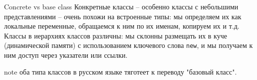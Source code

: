 \documentclass[
    8pt,
    hyperref={pdfencoding=unicode}
    ]{beamer}
\theoremstyle{definition}
\begin{document}
\begin{frame}[fragile]{Concrete vs base class}
    Конкретные классы -- особенно классы с небольшими представлениями -- очень похожи на встроенные типы: мы определяем их как локальные 
    переменные, обращаемся к ним по их именам, копируем их и т.д. Классы в иерархиях классов различны: мы склонны размещать их в куче 
    (динамической памяти) с использованием ключевого слова \texttt{new}, и мы получаем к ним доступ через указатели или ссылки. 
    
    \begin{block}{note}
        оба типа классов в русском языке тяготеет к переводу "базовый класс".
    \end{block}
    
\end{frame}
\end{document}
